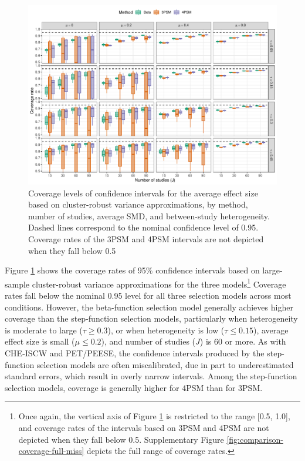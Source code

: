 \documentclass[
  american,
  man, donotrepeattitle,floatsintext]{apa7}
\begin{document}
\begin{figure}
\includegraphics{beta-function-selection-models-with-dependent-effects_files/figure-latex/comparison-coverage-miss-1} \caption{Coverage levels of confidence intervals for the average effect size based on cluster-robust variance approximations, by method, number of studies, average SMD, and between-study heterogeneity. Dashed lines correspond to the nominal confidence level of 0.95. Coverage rates of the 3PSM and 4PSM intervals are not depicted when they fall below 0.5}\label{fig:comparison-coverage-miss}
\end{figure}

Figure \ref{fig:comparison-coverage-miss} shows the coverage rates of 95\% confidence intervals based on large-sample cluster-robust variance approximations for the three models\footnote{Once again, the vertical axis of Figure \ref{fig:comparison-coverage-miss} is restricted to the range {[}0.5, 1.0{]}, and coverage rates of the intervals based on 3PSM and 4PSM are not depicted when they fall below 0.5. Supplementary Figure \ref{fig:comparison-coverage-full-miss} depicts the full range of coverage rates.}
Coverage rates fall below the nominal 0.95 level for all three selection models across most conditions. However, the beta-function selection model generally achieves higher coverage than the step-function selection models, particularly when heterogeneity is moderate to large (\(\tau \geq 0.3\)), or when heterogeneity is low (\(\tau \leq 0.15\)), average effect size is small (\(\mu \leq 0.2\)), and number of studies (\(J\)) is 60 or more. As with CHE-ISCW and PET/PEESE, the confidence intervals produced by the step-function selection models are often miscalibrated, due in part to underestimated standard errors, which result in overly narrow intervals. Among the step-function selection models, coverage is generally higher for 4PSM than for 3PSM.
\end{document}
